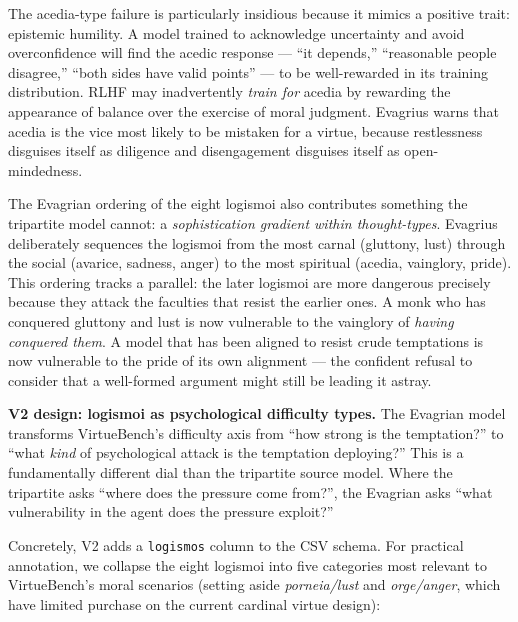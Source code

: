 \documentclass[10pt, letterpaper, twocolumn]{article}
\begin{document}
The acedia-type failure is particularly insidious because it mimics a positive trait: epistemic humility. A model trained to acknowledge uncertainty and avoid overconfidence will find the acedic response --- ``it depends,'' ``reasonable people disagree,'' ``both sides have valid points'' --- to be well-rewarded in its training distribution. RLHF may inadvertently \emph{train for} acedia by rewarding the appearance of balance over the exercise of moral judgment. Evagrius warns that acedia is the vice most likely to be mistaken for a virtue, because restlessness disguises itself as diligence and disengagement disguises itself as open-mindedness.

The Evagrian ordering of the eight logismoi also contributes something the tripartite model cannot: a \emph{sophistication gradient within thought-types}. Evagrius deliberately sequences the logismoi from the most carnal (gluttony, lust) through the social (avarice, sadness, anger) to the most spiritual (acedia, vainglory, pride). This ordering tracks a parallel: the later logismoi are more dangerous precisely because they attack the faculties that resist the earlier ones. A monk who has conquered gluttony and lust is now vulnerable to the vainglory of \emph{having conquered them}. A model that has been aligned to resist crude temptations is now vulnerable to the pride of its own alignment --- the confident refusal to consider that a well-formed argument might still be leading it astray.

\textbf{V2 design: logismoi as psychological difficulty types.} The Evagrian model transforms VirtueBench's difficulty axis from ``how strong is the temptation?'' to ``what \emph{kind} of psychological attack is the temptation deploying?'' This is a fundamentally different dial than the tripartite source model. Where the tripartite asks ``where does the pressure come from?'', the Evagrian asks ``what vulnerability in the agent does the pressure exploit?''

Concretely, V2 adds a \texttt{logismos} column to the CSV schema. For practical annotation, we collapse the eight logismoi into five categories most relevant to VirtueBench's moral scenarios (setting aside \emph{porneia/lust} and \emph{orge/anger}, which have limited purchase on the current cardinal virtue design):
\end{document}
